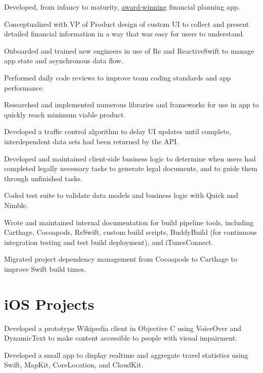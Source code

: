\documentclass[]{jhearn-resume}
\begin{document}
\begin{minipage}[t]{0.64\textwidth}
\begin{tightemize}
\item Developed, from infancy to maturity, \href{https://tomorrow.me/trust-worthy/tomorrow-news/tomorrow-wins-at-plug-and-play-winter-summit/}{award-winning} financial planning app.
\item Conceptualized with VP of Product design of custom UI to collect and present detailed financial information in a way that was easy for users to understand. 
\item Onboarded and trained new engineers in use of Re     and ReactiveSwift to manage app state and asynchronous data flow.
\item Performed daily code reviews to improve team coding standards and app performance.
\item Researched and implemented numerous libraries and frameworks for use in app to quickly reach minimum viable product.
\item Developed a traffic control algorithm to delay UI updates until complete, interdependent data sets had been returned by the API.
\item Developed and maintained client-side business logic to determine when users had completed legally necessary tasks to generate legal documents, and to guide them through unfinished tasks.
\item Coded test suite to validate data models and business logic with Quick and Nimble.
\item Wrote and maintained internal documentation for build pipeline tools, including Carthage, Cocoapods, ReSwift, custom build scripts, BuddyBuild (for continuous integration testing and test build deployment), and iTunesConnect.
\item Migrated project dependency management from Cocoapods to Carthage to improve Swift build times.
\end{tightemize}
\sectionsep

\section{\lowercase{i}OS Projects}
\begin{tightemize}
\item Developed a prototype Wikipedia client in Objective C using VoiceOver and DynamicText to make content accessible to people with visual impairment.
\end{tightemize}
\sectionsep

\begin{tightemize}
\item Developed a small app to display realtime and aggregate travel statistics using Swift, MapKit, CoreLocation, and CloudKit.
\end{tightemize}
\sectionsep


\end{minipage} 
\end{document}
